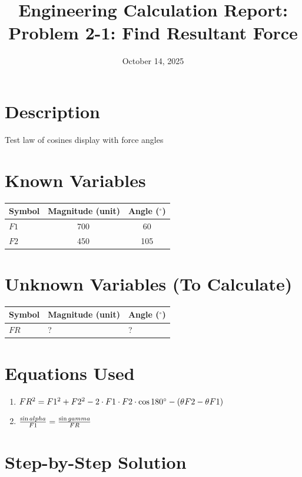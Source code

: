 \documentclass[11pt,a4paper]{article}
\title{Engineering Calculation Report: Problem 2-1: Find Resultant Force}
\date{October 14, 2025}
\begin{document}
\maketitle

\section*{Description}
\noindent
\begin{minipage}{\textwidth}
Test law of cosines display with force angles
\end{minipage}
\par

\section{Known Variables}

\begin{longtable}{lSS}
\toprule
Symbol & {Magnitude (unit)} & {Angle ($^\circ$)} \\
\midrule
\endhead
$F1$ & 700\, & 60 \\
$F2$ & 450\, & 105 \\
\bottomrule
\end{longtable}

\section{Unknown Variables (To Calculate)}

\begin{longtable}{lll}
\toprule
Symbol & Magnitude (unit) & Angle ($^\circ$) \\
\midrule
\endhead
$FR$ & ? & ? \\
\bottomrule
\end{longtable}

\section{Equations Used}

\begin{enumerate}
\item $\Large FR^{2} = F1^{2} + F2^{2} - 2 \cdot F1 \cdot F2 \cdot \cos{180^\circ - (\theta_{}{F2} - \theta_{}{F1}})$
\item $\Large \frac{\sin{alpha}}{F1} = \frac{\sin{gamma}}{FR}$
\end{enumerate}

\section{Step-by-Step Solution}
\end{document}
